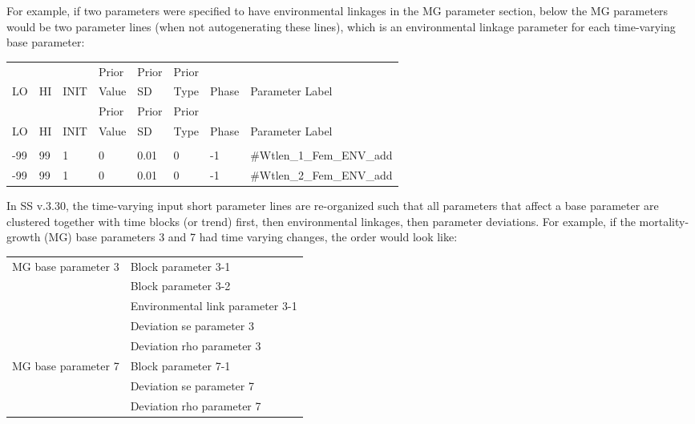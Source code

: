 For example, if two parameters were specified to have environmental linkages in the MG parameter section, below the MG parameters would be two parameter lines (when not autogenerating these lines), which is an environmental linkage parameter for each time-varying base parameter:
\begin{longtable}{ p{0.7cm} p{0.7cm} p{0.7cm}  p{1cm}  p{1.4cm}  p{1cm} p{1cm} p{6.7cm}  }
	\hline
	   &    &      & Prior &  Prior & Prior & & \Tstrut\\
	LO & HI & INIT & Value &  SD    & Type  & Phase & Parameter Label \Bstrut\\
	\hline
	\endfirsthead
	
	\hline
	   &    &      & Prior &  Prior & Prior &  & \Tstrut\\
	LO & HI & INIT & Value &  SD    & Type  & Phase & Parameter Label \Bstrut\\
	\hline
	\endhead
	
	\endfoot
	
	\endlastfoot
	
	\multicolumn{7}{l}{COND: Only if MG parameters are time-varying} \Tstrut\\
	-99   & 99  & 1 & 0 & 0.01 & 0 & -1 &\#Wtlen\_1\_Fem\_ENV\_add\Tstrut\\
	-99   & 99  & 1 & 0 & 0.01 & 0 & -1 &\#Wtlen\_2\_Fem\_ENV\_add\Bstrut\\
	\hline
\end{longtable}

 In SS v.3.30, the time-varying input short parameter lines are re-organized such that all parameters that affect a base parameter are clustered together with time blocks (or trend) first, then environmental linkages, then parameter deviations. For example, if the mortality-growth (MG) base parameters 3 and 7 had time varying changes, the order would look like:

\begin{center}
	\begin{longtable}{p{5cm} p{10cm}}
		\hline
		MG base parameter 3 & Block parameter 3-1\Tstrut\\
		& Block parameter 3-2\\
		& Environmental link parameter 3-1\\
		& Deviation se parameter 3 \\
		& Deviation rho parameter 3 \Bstrut\\
		MG base parameter 7 & Block parameter 7-1 \\
		& Deviation se parameter 7 \\
		& Deviation rho parameter 7 \Bstrut\\
		\hline	 	                    
		
	\end{longtable}
\end{center}

